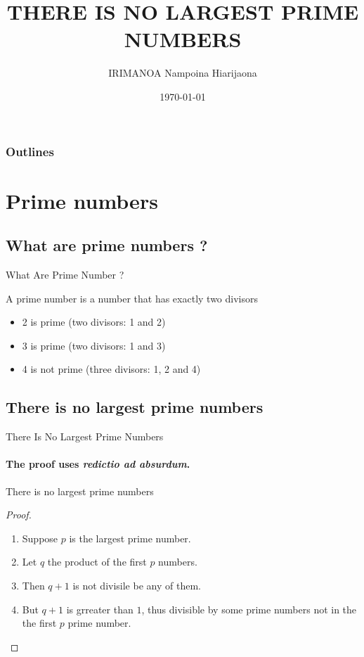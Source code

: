 \documentclass[compress,t]{beamer}
\title{THERE IS NO LARGEST PRIME NUMBERS}
\author[Manoa]{IRIMANOA Nampoina Hiarijaona}
\institute{CRIAT MAdagascar \\ Center Antananarivo}
\date{\today}
\begin{document}
\begin{frame}[plain]
    \maketitle\end{frame}

\begin{frame}[plain]
	\frametitle{Outlines}
	\tableofcontents[hideallsubsections]
\end{frame}

\section{Prime numbers}
\subsection{What are prime numbers ?}
\begin{frame}{What Are Prime Number ?}
	\begin{definition}
		A prime number is a number that has exactly two divisors
	\end{definition}
	\begin{example}
		\begin{itemize}
			\item 2 is prime (two divisors: 1 and 2)
			\item 3 is prime (two divisors: 1 and 3)
			\item 4 is not prime (three divisors: 1, 2 and 4)
		\end{itemize}
	\end{example}
\end{frame}

\subsection{There is no largest prime numbers}
\begin{frame}{There Is No Largest Prime Numbers}
	\transdissolve
	\framesubtitle{The proof uses \textit{redictio ad absurdum}.}
	
	\begin{theorem}
		There is no largest prime numbers
	\end{theorem}
	
	\begin{proof}
		\begin{enumerate}
			\item Suppose $p$ is the largest prime number.
			\item Let $q$ the product of the first $p$ numbers.
			\item Then $q + 1$ is not divisile be any of them.
			\item But $q + 1$ is grreater than $1$, thus divisible by some prime numbers not in the the first $p$ prime number.\qedhere 
		\end{enumerate}
	\end{proof}
\end{frame}
\end{document}
